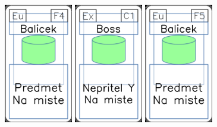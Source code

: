 \documentclass[a4paper]{article}
\begin{document}
	\includegraphics[width=3.0cm]{img-4_28}
	\includegraphics[width=3.0cm]{img-4_10}
	\includegraphics[width=3.0cm]{img-4_29}
\end{document}
